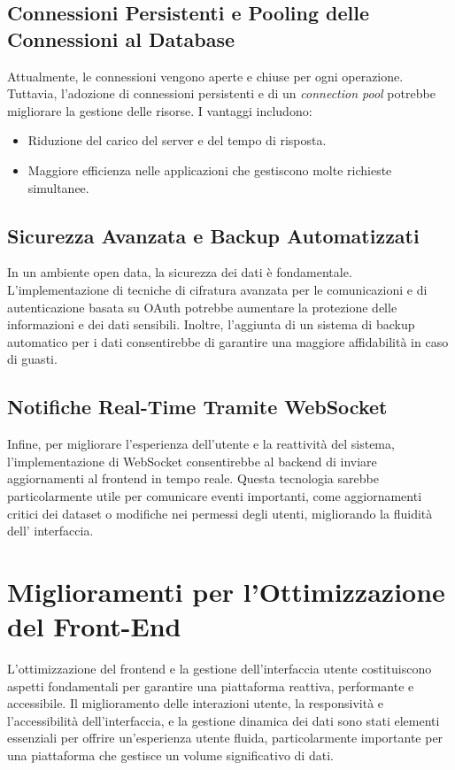 \subsection{Connessioni Persistenti e Pooling delle Connessioni al Database}

Attualmente, le connessioni vengono aperte e chiuse per ogni operazione. Tuttavia, l’adozione di connessioni persistenti e di un \textit{connection pool} potrebbe migliorare la gestione delle risorse. I vantaggi includono:
\begin{itemize}
    \item Riduzione del carico del server e del tempo di risposta.
    \item Maggiore efficienza nelle applicazioni che gestiscono molte richieste simultanee.
\end{itemize}

\subsection{Sicurezza Avanzata e Backup Automatizzati}

In un ambiente open data, la sicurezza dei dati è fondamentale. L'implementazione di tecniche di cifratura avanzata per le comunicazioni e di autenticazione basata su OAuth potrebbe aumentare la protezione delle informazioni e dei dati sensibili. Inoltre, l’aggiunta di un sistema di backup automatico per i dati consentirebbe di garantire una maggiore affidabilità in caso di guasti.

\subsection{Notifiche Real-Time Tramite WebSocket}

Infine, per migliorare l’esperienza dell’utente e la reattività del sistema, l’implementazione di WebSocket consentirebbe al backend di inviare aggiornamenti al frontend in tempo reale. Questa tecnologia sarebbe particolarmente utile per comunicare eventi importanti, come aggiornamenti critici dei dataset o modifiche nei permessi degli utenti, migliorando la fluidità dell’ interfaccia.


\section{Miglioramenti per l’Ottimizzazione del Front-End}

L’ottimizzazione del frontend e la gestione dell’interfaccia utente costituiscono aspetti fondamentali per garantire una piattaforma reattiva, performante e accessibile. Il miglioramento delle interazioni utente, la responsività e l'accessibilità dell’interfaccia, e la gestione dinamica dei dati sono stati elementi essenziali per offrire un’esperienza utente fluida, particolarmente importante per una piattaforma che gestisce un volume significativo di dati.

